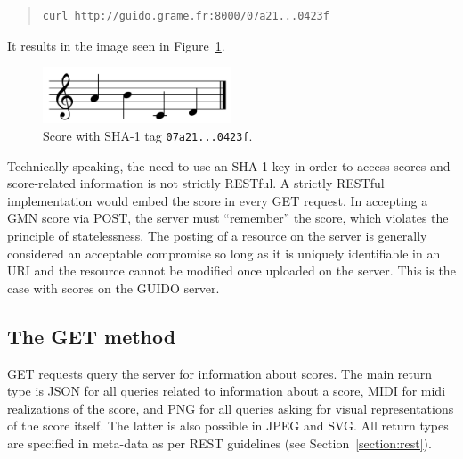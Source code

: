 \documentclass[11pt,a4paper]{article}
\newcommand{\guidosize}{7pt}
\begin{document}
\begin{quote}
\begingroup
\fontsize{\guidosize}{12pt}\selectfont
\begin{verbatim}
curl http://guido.grame.fr:8000/07a21...0423f
\end{verbatim}
\endgroup
\end{quote}
It results in the image seen in Figure~\ref{fig:figure1}.
\begin{figure}[h]
  \centering
    \includegraphics[width=0.5\textwidth]{figure1}
  \cprotect\caption{\label{fig:figure1}Score with SHA-1 tag \verb=07a21...0423f=.}
\end{figure}
Technically speaking, the need to use an SHA-1 key in order to access scores and score-related information is not strictly RESTful.  A strictly RESTful implementation would embed the score in every GET request. In accepting a GMN score via POST, the server must ``remember'' the score, which violates the principle of statelessness.  The posting of a resource on the server is generally considered an acceptable compromise \cite{richardson2008restful} so long as it is uniquely identifiable in an URI and the resource cannot be modified once uploaded on the server.  This is the case with scores on the GUIDO server.\par

\subsection{The GET method}\label{subsection:get}
GET requests query the server for information about scores. The main return type is JSON for all queries related to information about a score, MIDI for midi realizations of the score, and PNG for all queries asking for visual representations of the score itself.  The latter is also possible in JPEG and SVG.  All return types are specified in meta-data as per REST guidelines (see Section~\ref{section:rest}).\par
\end{document}
